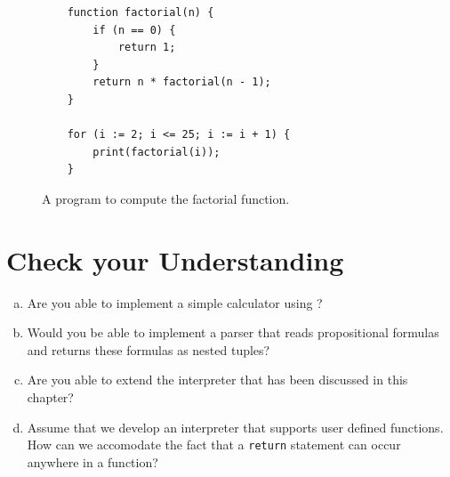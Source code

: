 \begin{figure}[!ht]
\centering
\begin{verbatim}
    function factorial(n) {
        if (n == 0) {
            return 1;
        }
        return n * factorial(n - 1);
    }
    
    for (i := 2; i <= 25; i := i + 1) {
        print(factorial(i));
    }                 
\end{verbatim}
\vspace*{-0.3cm}
\caption{A program to compute the factorial function.}
\label{fig:factorial.sl}
\end{figure}
\pagebreak

\section{Check your Understanding}
\begin{enumerate}[(a)]
\item Are you able to implement a simple calculator using ?
\item Would you be able to implement a  parser that reads propositional formulas and returns these
      formulas as nested tuples? 
\item Are you able to extend the interpreter that has been discussed in this chapter?
\item Assume that we develop an interpreter that supports user defined functions.
      How can we accomodate the fact that a \texttt{return} statement can occur anywhere in a function? 
\end{enumerate}



